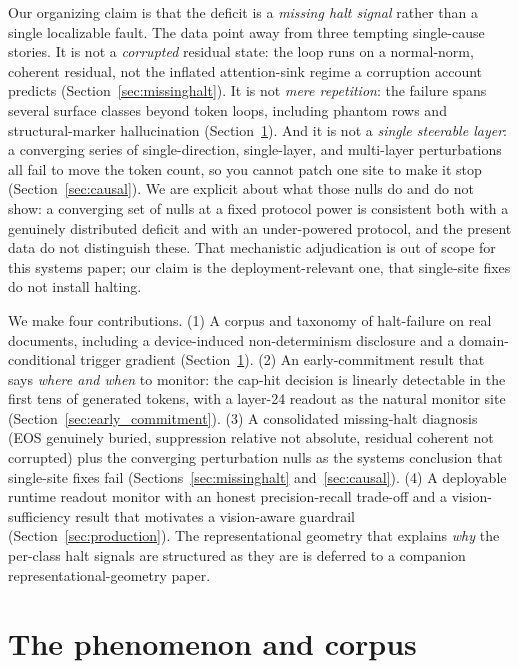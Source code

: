 \documentclass[11pt]{article}
\begin{document}
Our organizing claim is that the deficit is a \emph{missing halt signal} rather than a
single localizable fault. The data point away from three tempting single-cause stories.
It is not a \emph{corrupted} residual state: the loop runs on a normal-norm, coherent
residual, not the inflated attention-sink regime a corruption account predicts
(Section~\ref{sec:missinghalt}). It is not \emph{mere repetition}: the failure spans
several surface classes beyond token loops, including phantom rows and structural-marker
hallucination (Section~\ref{sec:phenomenon}). And it is not a \emph{single steerable
layer}: a converging series of single-direction, single-layer, and multi-layer
perturbations all fail to move the token count, so you cannot patch one site to make it
stop (Section~\ref{sec:causal}). We are explicit about what those nulls do and do not
show: a converging set of nulls at a fixed protocol power is consistent both with a
genuinely distributed deficit and with an under-powered protocol, and the present data do
not distinguish these. That mechanistic adjudication is out of scope for this systems
paper; our claim is the deployment-relevant one, that single-site fixes do not install
halting.

We make four contributions. (1) A corpus and taxonomy of halt-failure on real documents,
including a device-induced non-determinism disclosure and a domain-conditional trigger
gradient (Section~\ref{sec:phenomenon}). (2) An early-commitment result that says
\emph{where and when} to monitor: the cap-hit decision is linearly detectable in the first
tens of generated tokens, with a layer-24 readout as the natural monitor site
(Section~\ref{sec:early_commitment}). (3) A consolidated missing-halt diagnosis (EOS
genuinely buried, suppression relative not absolute, residual coherent not corrupted) plus
the converging perturbation nulls as the systems conclusion that single-site fixes fail
(Sections~\ref{sec:missinghalt} and~\ref{sec:causal}). (4) A deployable runtime readout
monitor with an honest precision-recall trade-off and a vision-sufficiency result that
motivates a vision-aware guardrail (Section~\ref{sec:production}). The representational
geometry that explains \emph{why} the per-class halt signals are structured as they are is
deferred to a companion representational-geometry paper.

\section{The phenomenon and corpus}
\label{sec:phenomenon}
\end{document}
